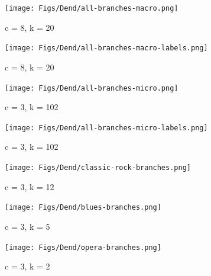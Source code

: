 \documentclass[a4paper,12pt]{extarticle}
\begin{document}
\begin{figure}[ht!]
     \begin{subfigure}[b]{0.5\textwidth}
        \centering
        \texttt{[image: Figs/Dend/all-branches-macro.png]}
        \caption{c = 8, k = 20}
        \label{fig:dend-macro}
    \end{subfigure} 
     \begin{subfigure}[b]{0.5\textwidth}
        \centering
        \texttt{[image: Figs/Dend/all-branches-macro-labels.png]}
        \caption{c = 8, k = 20}
        \label{fig:dend-macro-labels}
    \end{subfigure} 
     \begin{subfigure}[b]{0.5\textwidth}
        \centering
        \texttt{[image: Figs/Dend/all-branches-micro.png]}
        \caption{c = 3, k = 102}
        \label{fig:dend-micro}
    \end{subfigure} 
     \begin{subfigure}[b]{0.5\textwidth}
        \centering
        \texttt{[image: Figs/Dend/all-branches-micro-labels.png]}
        \caption{c = 3, k = 102}
        \label{fig:dend-micro-labels}
    \end{subfigure}
     \begin{subfigure}[b]{0.32\textwidth}
        \centering
        \texttt{[image: Figs/Dend/classic-rock-branches.png]}
        \caption{c = 3, k = 12}
        \label{fig:dend-micro-classic-rock}
    \end{subfigure} 
     \begin{subfigure}[b]{0.32\textwidth}
        \centering
        \texttt{[image: Figs/Dend/blues-branches.png]}
        \caption{c = 3, k = 5}
        \label{fig:dend-micro-blues}
    \end{subfigure}
     \begin{subfigure}[b]{0.32\textwidth}
        \centering
        \texttt{[image: Figs/Dend/opera-branches.png]}
        \caption{c = 3, k = 2}
        \label{fig:dend-micro-opera}
    \end{subfigure}
    \caption{}
    \label{fig:dend}
 \end{figure}
 
\end{document}
